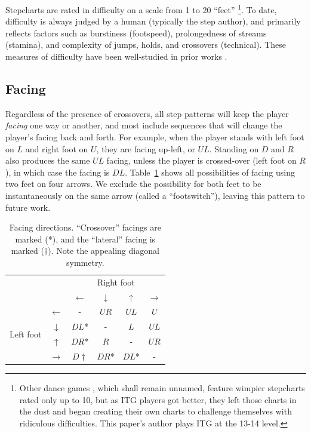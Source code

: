 \documentclass[10pt]{sigplanconf}
\begin{document}
Stepcharts are rated in difficulty on a scale from 1 to 20 ``feet'' \cite{simplylove}\footnote{
Other dance games \cite{konami}, which shall remain unnamed, feature wimpier stepcharts rated only up to 10, but as ITG players got better, they left those charts in the dust and began creating their own charts to challenge themselves with ridiculous difficulties. This paper's author plays ITG at the 13-14 level.}.
To date, difficulty is always judged by a human (typically the step author), and primarily reflects factors such as burstiness (footspeed), prolongedness of streams (stamina), and complexity of jumps, holds, and crossovers (technical).
These measures of difficulty have been well-studied in prior works \cite{callofthehound,dawgsinthehouse}.

\subsection{Facing}

Regardless of the presence of crossovers, all step patterns will keep the player {\em facing} one way or another, and most include sequences that will change the player's facing back and forth.
For example, when the player stands with left foot on $L$ and right foot on $U$, they are facing up-left, or $UL$. Standing on $D$ and $R$ also produces the same $UL$ facing, unless the player is crossed-over (left foot on $R$), in which case the facing is $DL$.
Table~\ref{tab:facing} shows all possibilities of facing using two feet on four arrows.
We exclude the possibility for both feet to be instantaneously on the same arrow (called a ``footswitch''), leaving this pattern to future work.

\begin{table}[h]
	\begin{center}
	\begin{tabular}{cc|cccc}
		& & \multicolumn{4}{c}{Right foot} \\
		& & $\leftarrow$ & $\downarrow$ & $\uparrow$ & $\rightarrow$ \\
		\hline
		\multirow{4}{*}{Left foot}
		& $\leftarrow$  & - & $UR$ & $UL$ & $U$ \\
		& $\downarrow$  & $DL$* & - & $L$ & $UL$ \\
		& $\uparrow$    & $DR$* & $R$ & - & $UR$ \\
		& $\rightarrow$ & $D\dagger$ & $DR$* & $DL$* & - \\

	\end{tabular}
	\end{center}
	\caption{Facing directions. ``Crossover'' facings are marked (*), and the ``lateral'' facing is marked ($\dagger$). Note the appealing diagonal symmetry.}
	\label{tab:facing}
\end{table}
\end{document}
